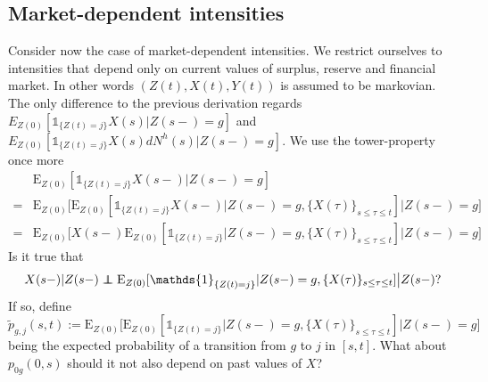 \documentclass[12pt]{article}
\newcommand{\E}{\text{E}}
\newcommand{\indic}[1]{\mathds{1}_{ \{ #1 \} }}
\newcommand\independent{\protect\mathpalette{\protect\independenT}{\perp}}
\def\independenT#1#2{\mathrel{\rlap{$#1#2$}\mkern2mu{#1#2}}}
\begin{document}
\subsection*{Market-dependent intensities}
Consider now the case of market-dependent intensities. We restrict ourselves to intensities that depend only on current values of surplus, reserve and financial market. In other words $(Z(t),X(t),Y(t))$ is assumed to be markovian. The only difference to the previous derivation regards $E_{Z(0)}[\indic{Z(t)=j}X(s)|Z(s-)=g]$ and $E_{Z(0)}[\indic{Z(t)=j}X(s)dN^h(s)|Z(s-)=g]$. We use the tower-property once more
\begin{align*}
&\E_{Z(0)}[\indic{Z(t)=j}X(s-)|Z(s-)=g]
\\
=&
\E_{Z(0)} \big[ \E_{Z(0)}[\indic{Z(t)=j}X(s-)|Z(s-)=g, \lbrace X(\tau) \rbrace_{s\leq \tau \leq t}] \big| Z(s-)=g \big]
\\
=&
\E_{Z(0)} \big[ X(s-) \E_{Z(0)}[\indic{Z(t)=j}|Z(s-)=g, \lbrace X(\tau) \rbrace_{s\leq \tau \leq t}] \big| Z(s-)=g \big]
\end{align*}
Is it true that 
$$
X(s-)|Z(s-) \independent \E_{Z(0)}[\indic{Z(t)=j}|Z(s-)=g, \lbrace X(\tau) \rbrace_{s\leq \tau \leq t}] \big| Z(s-)?
$$
If so, define
$$
\tilde{p}_{g,j}(s,t):=\E_{Z(0)} \big[ \E_{Z(0)}[\indic{Z(t)=j}|Z(s-)=g, \lbrace X(\tau) \rbrace_{s\leq \tau \leq t}] \big| Z(s-)=g \big]
$$
being the expected probability of a transition from $g$ to $j$ in $[s,t]$. What about $p_{0g}(0,s)$ should it not also depend on past values of $X$?
\end{document}
